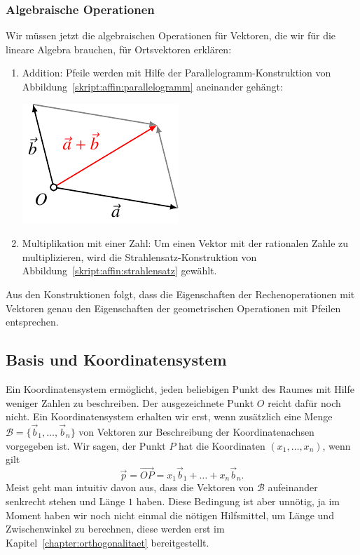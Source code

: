 \subsubsection{Algebraische Operationen}
Wir müssen jetzt die algebraischen Operationen für Vektoren,
die wir für die lineare Algebra brauchen, für Ortsvektoren erklären:
\begin{enumerate}
\item
Addition: Pfeile werden mit Hilfe der Parallelogramm-Konstruktion
von Abbildung~\ref{skript:affin:parallelogramm}
aneinander gehängt:
\begin{center}
\includegraphics{3/images/addition.pdf}
\end{center}
\item
Multiplikation mit einer Zahl: Um einen Vektor mit der rationalen
Zahle zu multiplizieren, wird die Strahlensatz-Konstruktion
von Abbildung~\ref{skript:affin:strahlensatz} gewählt.
\end{enumerate}
Aus den Konstruktionen folgt, dass die Eigenschaften der Rechenoperationen
mit Vektoren genau den Eigenschaften der geometrischen Operationen
mit Pfeilen entsprechen.

%
%
\subsection{Basis und Koordinatensystem}
Ein Koordinatensystem ermöglicht, jeden beliebigen Punkt des Raumes mit
Hilfe weniger Zahlen zu beschreiben.
Der ausgezeichnete Punkt $O$ reicht dafür noch nicht. 
Ein Koordinatensystem erhalten wir erst, wenn zusätzlich eine Menge
$\mathcal{B}=\{\vec{b}_1,\dots,\vec{b}_n\}$ von Vektoren zur Beschreibung
der Koordinatenachsen vorgegeben ist.
Wir sagen, der Punkt $P$ hat die Koordinaten $(x_1,\dots,x_n)$, wenn 
gilt
\[
\vec{p}=\overrightarrow{OP} = x_1\vec{b}_1+\dots+x_n\vec{b}_n.
\]
Meist geht man intuitiv davon aus, dass die Vektoren von $\mathcal{B}$
aufeinander senkrecht stehen und Länge $1$ haben.
Diese Bedingung
ist aber unnötig, ja im Moment haben wir noch nicht einmal die
nötigen Hilfsmittel, um Länge und Zwischenwinkel zu berechnen, diese
werden erst im Kapitel~\ref{chapter:orthogonalitaet} bereitgestellt.

